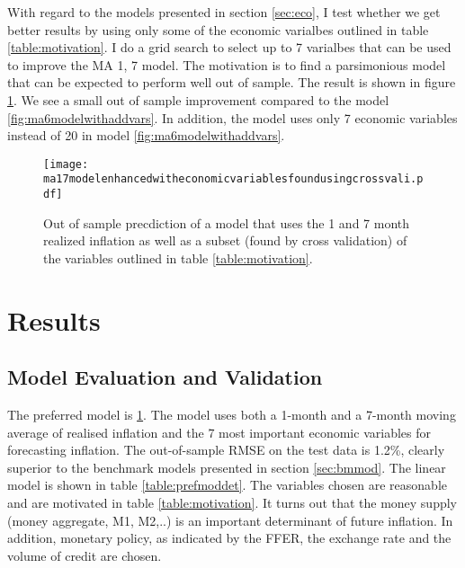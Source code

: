 \documentclass[12pt]{article}
\begin{document}
With regard to the models presented in section \ref{sec:eco}, I test whether we get better results by using only some of the economic varialbes outlined in table \ref{table:motivation}. I do a grid search to select up to 7 varialbes that can be used to improve the MA 1, 7 model. The motivation is to find a parsimonious model that can be expected to perform well out of sample. The result is shown in figure \ref{fig:ma17modelenhancedwitheconomicvariablesfoundusingcrossvali}. We see a small out of sample improvement compared to the model \ref{fig:ma6modelwithaddvars}. In addition, the model uses only 7 economic variables instead of 20 in model \ref{fig:ma6modelwithaddvars}.

\begin{figure}[h]
    \centering
    \texttt{[image: ma17modelenhancedwitheconomicvariablesfoundusingcrossvali.pdf]}
    \caption{Out of sample precdiction of a model that uses the 1 and 7 month realized inflation as well as a subset (found by cross validation) of the variables outlined in table \ref{table:motivation}. }
    \label{fig:ma17modelenhancedwitheconomicvariablesfoundusingcrossvali}
\end{figure}


\section{Results}
\subsection{Model Evaluation and Validation}
The preferred model is \ref{fig:ma17modelenhancedwitheconomicvariablesfoundusingcrossvali}. The model uses both a 1-month and a 7-month moving average of realised inflation and the 7 most important economic variables for forecasting inflation. The out-of-sample RMSE on the test data is 1.2\%, clearly superior to the benchmark models presented in section \ref{sec:bmmod}. The linear model is shown in table \ref{table:prefmoddet}. The variables chosen are reasonable and are motivated in table \ref{table:motivation}. It turns out that the money supply (money aggregate, M1, M2,..) is an important determinant of future inflation. In addition, monetary policy, as indicated by the FFER, the exchange rate and the volume of credit are chosen.
\end{document}
